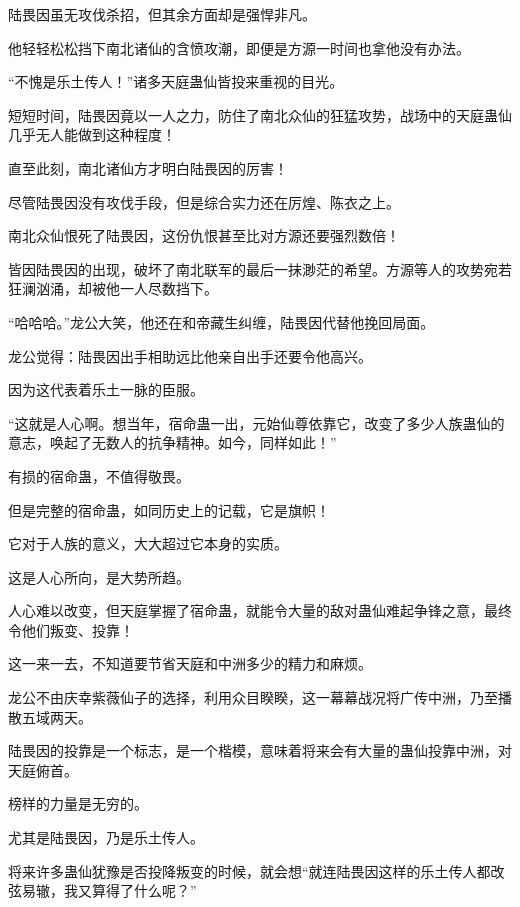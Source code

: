
\begin{this_body}

陆畏因虽无攻伐杀招，但其余方面却是强悍非凡。

他轻轻松松挡下南北诸仙的含愤攻潮，即便是方源一时间也拿他没有办法。

“不愧是乐土传人！”诸多天庭蛊仙皆投来重视的目光。

短短时间，陆畏因竟以一人之力，防住了南北众仙的狂猛攻势，战场中的天庭蛊仙几乎无人能做到这种程度！

直至此刻，南北诸仙方才明白陆畏因的厉害！

尽管陆畏因没有攻伐手段，但是综合实力还在厉煌、陈衣之上。

南北众仙恨死了陆畏因，这份仇恨甚至比对方源还要强烈数倍！

皆因陆畏因的出现，破坏了南北联军的最后一抹渺茫的希望。方源等人的攻势宛若狂澜汹涌，却被他一人尽数挡下。

“哈哈哈。”龙公大笑，他还在和帝藏生纠缠，陆畏因代替他挽回局面。

龙公觉得：陆畏因出手相助远比他亲自出手还要令他高兴。

因为这代表着乐土一脉的臣服。

“这就是人心啊。想当年，宿命蛊一出，元始仙尊依靠它，改变了多少人族蛊仙的意志，唤起了无数人的抗争精神。如今，同样如此！”

有损的宿命蛊，不值得敬畏。

但是完整的宿命蛊，如同历史上的记载，它是旗帜！

它对于人族的意义，大大超过它本身的实质。

这是人心所向，是大势所趋。

人心难以改变，但天庭掌握了宿命蛊，就能令大量的敌对蛊仙难起争锋之意，最终令他们叛变、投靠！

这一来一去，不知道要节省天庭和中洲多少的精力和麻烦。

龙公不由庆幸紫薇仙子的选择，利用众目睽睽，这一幕幕战况将广传中洲，乃至播散五域两天。

陆畏因的投靠是一个标志，是一个楷模，意味着将来会有大量的蛊仙投靠中洲，对天庭俯首。

榜样的力量是无穷的。

尤其是陆畏因，乃是乐土传人。

将来许多蛊仙犹豫是否投降叛变的时候，就会想“就连陆畏因这样的乐土传人都改弦易辙，我又算得了什么呢？”


\end{this_body}
